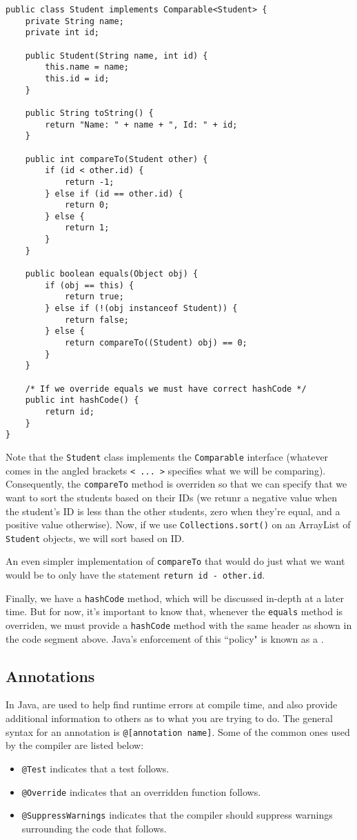 \begin{lstlisting}
public class Student implements Comparable<Student> {
	private String name;
	private int id;

	public Student(String name, int id) {
		this.name = name;
		this.id = id;
	}

	public String toString() {
		return "Name: " + name + ", Id: " + id;
	}

	public int compareTo(Student other) {
		if (id < other.id) {
			return -1;
		} else if (id == other.id) {
			return 0;
		} else {
			return 1;
		}
	}

	public boolean equals(Object obj) {
		if (obj == this) {
			return true;
		} else if (!(obj instanceof Student)) {
			return false;
		} else {
			return compareTo((Student) obj) == 0;
		}
	}

	/* If we override equals we must have correct hashCode */
	public int hashCode() {
		return id;
	}
}
\end{lstlisting}

Note that the \verb!Student! class implements the \verb!Comparable! interface (whatever comes in the angled brackets \verb!< ... >! specifies what we will be comparing). Consequently, the  \verb!compareTo! method is overriden so that we can specify that we want to sort the students based on their IDs (we retunr a negative value when the student's ID is less than the other students, zero when they're equal, and a positive value otherwise). Now, if we use \verb!Collections.sort()! on an ArrayList of \verb!Student! objects, we will sort based on ID. 

An even simpler implementation of \verb!compareTo! that would do just what we want would be to only have the statement \verb!return id - other.id!.

Finally, we have a \verb!hashCode! method, which will be discussed in-depth at a later time. But for now, it's important to know that, whenever the \verb!equals! method is overriden, we must provide a \verb!hashCode! method with the same header as shown in the code segment above. Java's enforcement of this ``policy" is known as a . 


\subsection{Annotations}
In Java,  are used to help find runtime errors at compile time, and also provide additional information to others as to what you are trying to do. The general syntax for an annotation is \verb!@[annotation name]!. Some of the common ones used by the compiler are listed below:
\begin{itemize}
    \item \verb!@Test! indicates that a test follows.
    \item \verb!@Override! indicates that an overridden function follows.
    \item \verb!@SuppressWarnings! indicates that the compiler should suppress warnings surrounding the code that follows.
\end{itemize}

